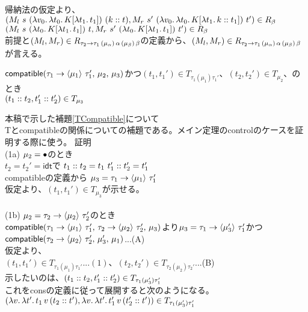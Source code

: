 帰納法の仮定より、\\
 $(M_l\ s \ \LamP{v_0}{\Lam{t_0}{K[\Lam{t_1}{t_1}]}}\ \ConsP{k}{t}, M_r\ s' \ \LamP{v_0}{\Lam{t_0}{K[\Lam{t_1}{\Cons{k}{t_1}}]}}\ t')\in R_{\beta}$\\
 $(M_l\ s \ \LamP{t_0}{K[\Lam{t_1}{t_1}]}\ t, M_r\ s' \ \LamP{t_0}{K[\Lam{t_1}{t_1}]}\ t')\in R_{\beta}$\\
 前提と$(M_l, M_r) \in R_{\TypeArrow{\tau_2}{\tau_1}{\mu_{\alpha}}{\alpha}{\mu_{\beta}}{\beta}}$の定義から、$(M_l, M_r) \in R_{\TypeArrow{\tau_2}{\tau_1}{\mu_{\alpha}}{\alpha}{\mu_{\beta}}{\beta}}$が言える。
\\
\setcounter{definition}{10}
\begin{lemma}
  $\Compatible{\Trail{\tau_1}{\tau_1'}{\mu_1}}{\mu_2}{\mu_3}$かつ$(t_1, t_1')\in T_{\tau_1(\mu_1)\tau_1'}、(t_2, t_2')\in T_{\mu_2}、$のとき\\
  $(\Cons{t_1}{t_2}, \Cons{t_1'}{t_2'})\in T_{\mu_3}$
\end{lemma}
本稿で示した補題\ref{TCompatible}について\\
Tと\textsf{compatible}の関係についての補題である。メイン定理の\textsf{control}のケースを証明する際に使う。
\lbrack 証明 \rbrack\\
(1a) $\mu_2=\Bullet$のとき\\
$t_2=t_2'=\textsf{idt}$で $\Cons{t_1}{t_2}=t_1\ \Cons{t_1'}{t_2'}=t_1'$\\
\textsf{compatible}の定義から $\mu_3 = \Trail{\tau_1}{\tau_1'}{\mu_1}$\\
仮定より、$(t_1,t_1')\in T_{\mu_3}$が示せる。\\
\\
(1b) $\mu_2=\Trail{\tau_2}{\tau_2'}{\mu_2}$のとき\\
$\Compatible{\Trail{\tau_1}{\tau_1'}{\mu_1}}{\Trail{\tau_2}{\tau_2'}{\mu_2}}{\mu_3}$より$\mu_3 = \Trail{\tau_1}{\tau_1'}{\mu_3'}$かつ$\Compatible{\Trail{\tau_2}{\tau_2'}{\mu_2}}{\mu_3'}{\mu_1}$...(A)\\
仮定より、\\
$(t_1, t_1')\in T_{\tau_1(\mu_1)\tau_1'}...(1)、(t_2, t_2')\in T_{\tau_2(\mu_2)\tau_2'}$...(B)\\
示したいのは、$(\Cons{t_1}{t_2}, \Cons{t_1'}{t_2'})\in T_{\tau_1(\mu_3')\tau_1'}$\\これを\textsf{cons}の定義に従って展開すると次のようになる。\\
$(\Lam{v}{\Lam{t'}{t_1\,v\,(\Cons{t_2}{t'})}}, \Lam{v}{\Lam{t'}{t_1'\,v\,(\Cons{t_2'}{t'})}})\in T_{\tau_1(\mu_3')\tau_1'}$\\
